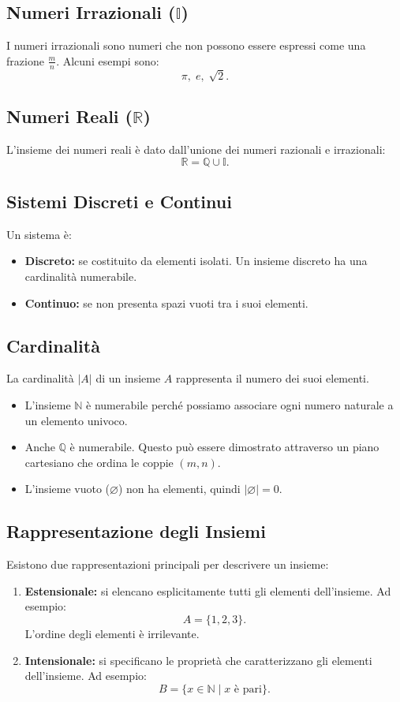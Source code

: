 \documentclass[a4paper,12pt]{article}
\begin{document}
\subsection*{Numeri Irrazionali (\( \mathbb{I} \))}
I numeri irrazionali sono numeri che non possono essere espressi come una frazione \( \frac{m}{n} \). Alcuni esempi sono:
\[
\pi, \; e, \; \sqrt{2}.
\]

\subsection*{Numeri Reali (\( \mathbb{R} \))}
L'insieme dei numeri reali è dato dall'unione dei numeri razionali e irrazionali:
\[
\mathbb{R} = \mathbb{Q} \cup \mathbb{I}.
\]

\subsection*{Sistemi Discreti e Continui}
Un sistema è:
\begin{itemize}
    \item \textbf{Discreto:} se costituito da elementi isolati. Un insieme discreto ha una cardinalità numerabile.
    \item \textbf{Continuo:} se non presenta spazi vuoti tra i suoi elementi.
\end{itemize}

\subsection*{Cardinalità}
La cardinalità \( |A| \) di un insieme \( A \) rappresenta il numero dei suoi elementi. 
\begin{itemize}
    \item L'insieme \( \mathbb{N} \) è numerabile perché possiamo associare ogni numero naturale a un elemento univoco.
    \item Anche \( \mathbb{Q} \) è numerabile. Questo può essere dimostrato attraverso un piano cartesiano che ordina le coppie \( (m, n) \).
    \item L'insieme vuoto (\( \varnothing \)) non ha elementi, quindi \( |\varnothing| = 0 \).
\end{itemize}

\subsection*{Rappresentazione degli Insiemi}
Esistono due rappresentazioni principali per descrivere un insieme:
\begin{enumerate}
    \item \textbf{Estensionale:} si elencano esplicitamente tutti gli elementi dell'insieme. Ad esempio:
    \[
    A = \{1, 2, 3\}.
    \]
    L'ordine degli elementi è irrilevante.
    \item \textbf{Intensionale:} si specificano le proprietà che caratterizzano gli elementi dell'insieme. Ad esempio:
    \[
    B = \{x \in \mathbb{N} \; | \; x \text{ è pari}\}.
    \]
\end{enumerate}
\end{document}
